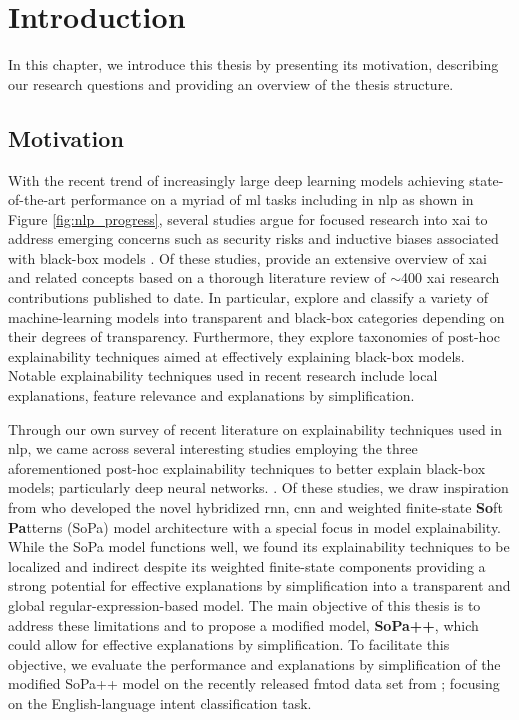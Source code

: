 \chapter{Introduction}

\label{chapter:introduction}

In this chapter, we introduce this thesis by presenting its motivation,
describing our research questions and providing an overview of the thesis
structure.

\section{Motivation}

With the recent trend of increasingly large deep learning models achieving
state-of-the-art performance on a myriad of \ac{ml} tasks including in \ac{nlp}
as shown in Figure \ref{fig:nlp_progress}, several studies argue for focused
research into \ac{xai} to address emerging concerns such as security risks and
inductive biases associated with black-box models
\citep{doran2017does,townsend2019extracting,danilevsky2020survey,arrieta2020explainable}.
Of these studies, \citet{arrieta2020explainable} provide an extensive overview
of \ac{xai} and related concepts based on a thorough literature review of
$\sim$400 \ac{xai} research contributions published to date. In particular,
\citet{arrieta2020explainable} explore and classify a variety of
machine-learning models into transparent and black-box categories depending on
their degrees of transparency. Furthermore, they explore taxonomies of post-hoc
explainability techniques aimed at effectively explaining black-box models.
Notable explainability techniques used in recent research include local
explanations, feature relevance and explanations by simplification.

Through our own survey of recent literature on explainability techniques used in
\ac{nlp}, we came across several interesting studies employing the three
aforementioned post-hoc explainability techniques to better explain black-box
models; particularly deep neural networks.
\citep{schwartz2018sopa,peng2018rational,suresh-etal-2019-distilling,wang2019state,jiang2020cold}.
Of these studies, we draw inspiration from \citet{schwartz2018sopa} who
developed the novel hybridized \ac{rnn}, \ac{cnn} and weighted finite-state
\textbf{So}ft \textbf{Pa}tterns (SoPa) model architecture with a special focus
in model explainability. While the SoPa model functions well, we found its
explainability techniques to be localized and indirect despite its weighted
finite-state components providing a strong potential for effective explanations
by simplification into a transparent and global regular-expression-based model.
The main objective of this thesis is to address these limitations and
to propose a modified model, \textbf{SoPa++}, which could allow for effective
explanations by simplification. To facilitate this objective, we evaluate the
performance and explanations by simplification of the modified SoPa++ model on
the recently released \ac{fmtod} data set from
\citet{schuster-etal-2019-cross-lingual}; focusing on the English-language
intent classification task.

